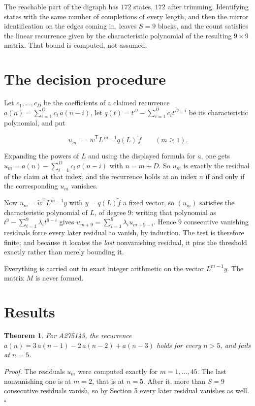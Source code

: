 \documentclass[11pt]{article}
\newtheorem{theorem}{Theorem}
\theoremstyle{definition}
\begin{document}
The reachable part of the digraph has $172$ states, $172$ after trimming. Identifying states with the same number of completions of every length, and then the mirror identification on the edges coming in, leaves $S = 9$ blocks, and the count satisfies the linear recurrence given by the characteristic polynomial of the resulting $9\times9$ matrix. That bound is computed, not assumed.

\section{The decision procedure}

Let $c_1,\dots,c_D$ be the coefficients of a claimed recurrence $a(n) = \sum_{i=1}^{D} c_i\,a(n-i)$, let $q(t) = t^{D} - \sum_{i=1}^{D} c_i t^{D-i}$ be its characteristic polynomial, and put

\[u_m \;=\; \tilde w^{\mathsf T} L^{\,m-1} q(L)\,\tilde f \qquad (m \ge 1).\]

Expanding the powers of $L$ and using the displayed formula for $a$, one gets $u_m = a(n) - \sum_{i=1}^{D} c_i\,a(n-i)$ with $n = m + D$. So $u_m$ is exactly the residual of the claim at that index, and the recurrence holds at an index $n$ if and only if the corresponding $u_m$ vanishes.

Now $u_m = \tilde w^{\mathsf T} L^{m-1} y$ with $y = q(L)\tilde f$ a fixed vector, so $(u_m)$ satisfies the characteristic polynomial of $L$, of degree $9$: writing that polynomial as $t^{9} - \sum_{i=1}^{9} \lambda_i t^{9-i}$ gives $u_{m+9} = \sum_{i=1}^{9} \lambda_i u_{m+9-i}$. Hence $9$ consecutive vanishing residuals force every later residual to vanish, by induction. The test is therefore finite; and because it locates the {\itshape last} nonvanishing residual, it pins the threshold exactly rather than merely bounding it.

Everything is carried out in exact integer arithmetic on the vector $L^{m-1}y$. The matrix $M$ is never formed.

\section{Results}

\begin{theorem} For A275143, the recurrence $a(n) = 3\,a(n-1) - 2\,a(n-2) + a(n-3)$ holds for every $n > 5$, and fails at $n = 5$.\end{theorem}

{\itshape Proof.} The residuals $u_m$ were computed exactly for $m = 1,\dots,45$. The last nonvanishing one is at $m = 2$, that is at $n = 5$. After it, more than $S = 9$ consecutive residuals vanish, so by Section 5 every later residual vanishes as well. $\square$
\end{document}
